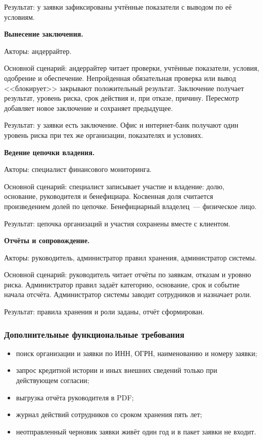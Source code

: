 Результат: у заявки зафиксированы учтённые показатели с выводом по её условиям.

\textbf{Вынесение заключения.}

Акторы: андеррайтер.

Основной сценарий: андеррайтер читает проверки, учтённые показатели, условия, одобрение и обеспечение. Непройденная обязательная проверка или вывод <<блокирует>> закрывают положительный результат. Заключение получает результат, уровень риска, срок действия и, при отказе, причину. Пересмотр добавляет новое заключение и сохраняет предыдущее.

Результат: у заявки есть заключение. Офис и интернет-банк получают один уровень риска при тех же организации, показателях и условиях.

\textbf{Ведение цепочки владения.}

Акторы: специалист финансового мониторинга.

Основной сценарий: специалист записывает участие и владение: долю, основание, руководителя и бенефициара. Косвенная доля считается произведением долей по цепочке. Бенефициарный владелец~--- физическое лицо.

Результат: цепочка организаций и участия сохранены вместе с клиентом.

\textbf{Отчёты и сопровождение.}

Акторы: руководитель, администратор правил хранения, администратор системы.

Основной сценарий: руководитель читает отчёты по заявкам, отказам и уровню риска. Администратор правил задаёт категорию, основание, срок и событие начала отсчёта. Администратор системы заводит сотрудников и назначает роли.

Результат: правила хранения и роли заданы, отчёт сформирован.

\subsubsection{Дополнительные функциональные требования}

\begin{itemize}
\item поиск организации и заявки по ИНН, ОГРН, наименованию и номеру заявки;
\item запрос кредитной истории и иных внешних сведений только при действующем согласии;
\item выгрузка отчёта руководителя в PDF;
\item журнал действий сотрудников со сроком хранения пять лет;
\item неотправленный черновик заявки живёт один год и в пакет заявки не входит.
\end{itemize}

